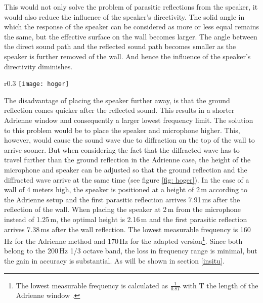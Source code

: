 This would not only solve the problem of parasitic reflections from the speaker, it would also reduce the influence of the speaker's directivity. The solid angle in which the response of the speaker can be considered as more or less equal remains the same, but the effective surface on the wall becomes larger. The angle between the direct sound path and the reflected sound path becomes smaller as the speaker is further removed of the wall. And hence the influence of the speaker's directivity diminishes.

\begin{wrapfigure}{r}{0.3\textwidth}
  \centering
    \texttt{[image: hoger]}
  \caption{Paths of the ground reflection and top diffraction.}
  \label{fig: hoger}
\end{wrapfigure}
The disadvantage of placing the speaker further away, is that the ground reflection comes quicker after the reflected sound. This results in a shorter Adrienne window and consequently a larger lowest frequency limit. The solution to this problem would be to place the speaker and microphone higher. This, however, would cause the sound wave due to diffraction on the top of the wall to arrive sooner. But when considering the fact that the diffracted wave has to travel further than the ground reflection in the Adrienne case, the height of the microphone and speaker can be adjusted so that the ground reflection and the diffracted wave arrive at the same time (see figure \ref{fig: hoger}). In the case of a wall of 4 meters high, the speaker is positioned at a height of 2\,m according to the Adrienne setup and the first parasitic reflection arrives 7.91\,ms after the reflection of the wall. When placing the speaker at 2\,m from the microphone instead of 1.25\,m, the optimal height is 2.16\,m and the first parasitic reflection arrives 7.38\,ms after the wall reflection. The lowest measurable frequency is 160\,Hz for the Adrienne method and 170\,Hz for the adapted version\footnote{The lowest measurable frequency is calculated as $\frac{1}{0.8 T}$ with T the length of the Adrienne window \cite[p.70]{Geetere}.}. Since both belong to the 200\,Hz 1/3 octave band, the loss in frequency range is minimal, but the gain in accuracy is substantial. As will be shown in section \ref{insitu}.




